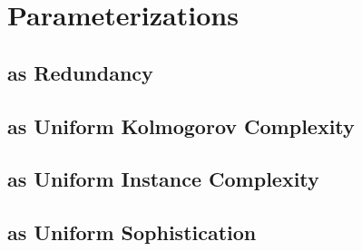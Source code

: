 \chapter{Parameterizations}








\section{as Redundancy}


\section{as Uniform Kolmogorov Complexity}


\section{as Uniform Instance Complexity}


\section{as Uniform Sophistication}

